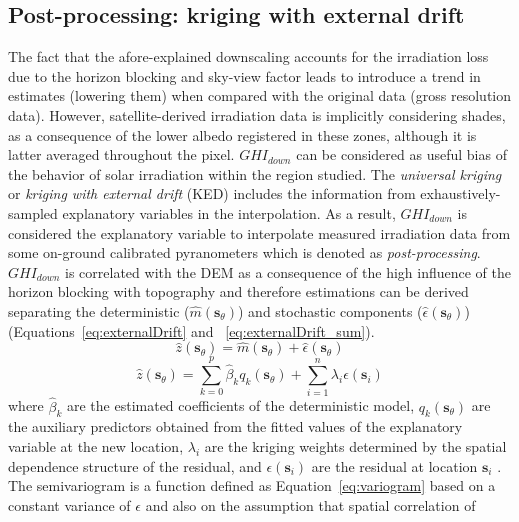 \documentclass[authoryear, sort&compress]{elsarticle}
\begin{document}
\subsection{Post-processing: kriging with external drift}
\label{sec:meth}
The fact that the afore-explained downscaling accounts for the
irradiation loss due to the horizon blocking and sky-view factor
leads to introduce a trend in estimates (lowering them) when
compared with the original data (gross resolution data). However,
satellite-derived irradiation data is implicitly considering
shades, as a consequence of the lower albedo registered in these
zones, although it is latter averaged throughout the
pixel. $GHI_{down}$ can be considered as useful bias of the
behavior of solar irradiation within the region studied. The
\emph{universal kriging} or \emph{kriging with external drift}
(KED) includes the information from exhaustively-sampled
explanatory variables in the interpolation. As a result,
$GHI_{down}$ is considered the explanatory variable to interpolate
measured irradiation data from some on-ground calibrated
pyranometers which is denoted as
\emph{post-processing}. $GHI_{down}$ is correlated with the DEM as
a consequence of the high influence of the horizon blocking with
topography and therefore estimations can be derived separating the
deterministic ($\hat{m}(\mathbf{s}_\theta)$) and stochastic
components ($\hat{\epsilon}(\mathbf{s}_\theta)$)
(Equations~\ref{eq:externalDrift} and
~\ref{eq:externalDrift_sum}).
\begin{equation}
\label{eq:externalDrift}
\hat{z}(\mathbf{\mathbf{s}}_\theta) = \hat{m}(\mathbf{s}_\theta) + \hat{\epsilon}(\mathbf{s}_\theta)
\end{equation}
\begin{equation}
\label{eq:externalDrift_sum}
\hat{z}(\mathbf{s}_\theta) = \sum_{k=0}^p \hat{\beta}_k q_k(\mathbf{s}_\theta) + 
\sum_{i=1}^n \lambda_i \epsilon(\mathbf{s}_i)
\end{equation}
where $\hat{\beta}_k$ are the estimated coefficients of the
deterministic model, $q_k(\mathbf{s}_\theta)$ are the auxiliary
predictors obtained from the fitted values of the explanatory
variable at the new location, $\lambda_i$ are the kriging weights
determined by the spatial dependence structure of the residual,
and $\epsilon(\mathbf{s}_i)$ are the residual at location
$\mathbf{s}_i$ \citep{Antonanzas-Torres.Canizares.ea2013}.
The semivariogram is a function defined as
Equation~\ref{eq:variogram} based on a constant variance of
$\epsilon$ and also on the assumption that spatial correlation of
\end{document}
